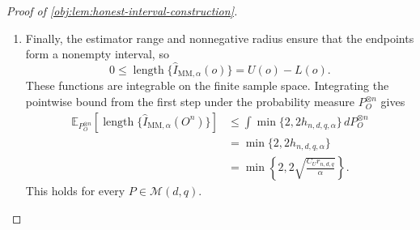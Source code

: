 \begin{proof}[Proof of \cref{obj:lem:honest-interval-construction}]
\begin{enumerate}
\item Finally, the estimator range and nonnegative radius ensure that the endpoints form a nonempty interval, so
\[
0\le\operatorname{length}\{\widehat I_{\mathrm{MM},\alpha}(o)\}
=U(o)-L(o).
\]
These functions are integrable on the finite sample space. Integrating the pointwise bound from the first step under the probability measure \(P_O^{\otimes n}\) gives
\[
\begin{aligned}
\mathbb E_{P_O^{\otimes n}}
\!\left[\operatorname{length}\{\widehat I_{\mathrm{MM},\alpha}(O^n)\}\right]
&\le
\int\min\{2,2h_{n,d,q,\alpha}\}\,dP_O^{\otimes n}\\
&=\min\{2,2h_{n,d,q,\alpha}\}\\
&=\min\left\{2,2\sqrt{\frac{C_Ur_{n,d,q}}{\alpha}}\right\}.
\end{aligned}
\]
This holds for every \(P\in\mathcal M(d,q)\).
\end{enumerate}
\end{proof}
